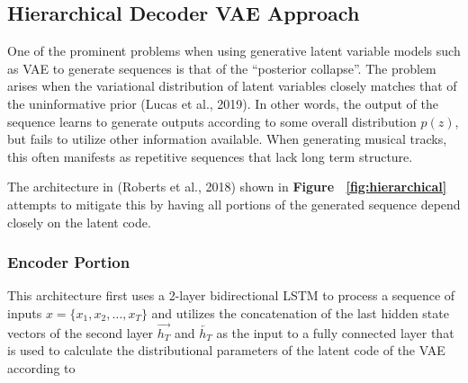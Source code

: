 \documentclass[10pt,twocolumn]{article}
\begin{document}
\subsection{Hierarchical Decoder VAE Approach}

One of the prominent problems when using generative latent variable models such as VAE to generate sequences is that of the ``posterior collapse''. The problem arises when the variational distribution of latent variables closely matches that of the uninformative prior (Lucas et al., 2019)\cite{lucas2019understanding}. In other words, the output of the sequence learns to generate outputs according to some overall distribution $p(z)$, but fails to utilize other information available. When generating musical tracks, this often manifests as repetitive sequences that lack long term structure.

The architecture in (Roberts et al., 2018) shown in \textbf{Figure ~\ref{fig:hierarchical}} attempts to mitigate this by having all portions of the generated sequence depend closely on the latent code.

\begin{figure}[H]
\end{figure}

\subsubsection{Encoder Portion}
This architecture first uses a 2-layer bidirectional LSTM to process a sequence of inputs $x = \{ x_1, x_2, \hdots, x_T \}$ and utilizes the concatenation of the last hidden state vectors of the second layer $\overrightarrow{h_T}$ and $\overleftarrow{h_T}$ as the input to a fully connected layer that is used to calculate the distributional parameters of the latent code of the VAE according to 
\end{document}
